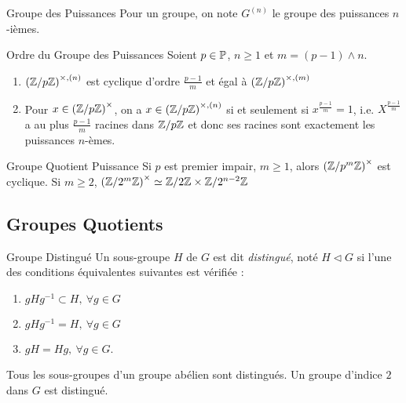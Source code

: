 \documentclass{cours}
\begin{document}
\begin{définition}{Groupe des Puissances}{}
    Pour un groupe, on note $G^{(n)}$ le groupe des puissances $n$-ièmes.
\end{définition}

\begin{propositionfr}{Ordre du Groupe des Puissances}{}
    Soient $p\in\P$, $n\geq 1$ et $m = (p-1)\wedge n$.
    \begin{enumerate}
        \item $\left(\Z/p\Z\right)^{\times, (n)}$ est cyclique d'ordre $\frac{p - 1}{m}$ et égal à $\left(\Z/p\Z\right)^{\times, (m)}$
        \item Pour $x \in \left(\znz{p}\right)^{\times}$, on a $x \in \left(\znz{p}\right)^{\times, (n)}$ si et seulement si $x^{\frac{p-1}{m}} = 1$, i.e. $X^{\frac{p-1}{m}}$ a au plus $\frac{p-1}{m}$ racines dans $\znz{p}$ et donc ses racines sont exactement les puissances $n$-èmes.
    \end{enumerate}
\end{propositionfr}

\begin{propositionfr}{Groupe Quotient Puissance}{}
    Si $p$ est premier impair, $m \geq 1$, alors $\left(\znz{p^{m}}\right)^{\times}$ est cyclique. Si $m\geq 2$, $\left(\znz{2^{m}}\right)^{\times} \simeq \znz{2} \times \znz{2^{n-2}}$
\end{propositionfr}

\subsection{Groupes Quotients}
\begin{définition}{Groupe Distingué}{}
    Un sous-groupe $H$ de $G$ est dit \emph{distingué}, noté $H \lhd G$ si l'une des conditions équivalentes suivantes est vérifiée :
    \begin{enumerate}
        \item $gHg^{-1} \subset H,\ \forall g \in G$
        \item $gHg^{-1} = H,\ \forall g \in G$
        \item $gH = Hg, \ \forall g \in G$.
    \end{enumerate}
\end{définition}

\begin{remark}
    Tous les sous-groupes d'un groupe abélien sont distingués. Un groupe d'indice $2$ dans $G$ est distingué.
\end{remark}
\end{document}
